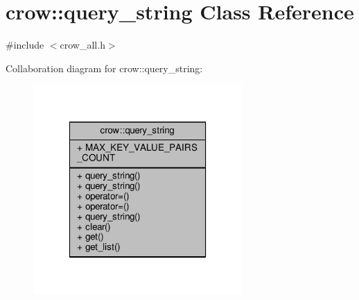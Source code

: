 \hypertarget{classcrow_1_1query__string}{\section{crow\-:\-:query\-\_\-string Class Reference}
\label{classcrow_1_1query__string}
}


{\ttfamily \#include $<$crow\-\_\-all.\-h$>$}



Collaboration diagram for crow\-:\-:query\-\_\-string\-:
\nopagebreak
\begin{figure}[H]
\begin{center}
\leavevmode
\includegraphics[width=226pt]{classcrow_1_1query__string__coll__graph}
\end{center}
\end{figure}
